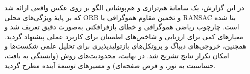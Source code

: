 
در این گزارش، یک سامانهٔ هم‌ترازی و هم‌پوشانی الگو بر روی عکس واقعی ارائه شد که بر پایهٔ ویژگی‌های محلی ORB و تخمین مقاوم هموگرافی با RANSAC بنا شده است. چارچوب ریاضی هموگرافی و خطای بازفرافکنی به‌صورت دقیق تعریف شد و معیارهای کمی برای ارزیابی و شاخص‌های اطمینان برای کاربرد عملی پیشنهاد گردید. همچنین، خروجی‌های دیباگ و پروتکل‌های بازتولیدپذیری برای تحلیل علمی شکست‌ها و امکان تکرار نتایج تشریح شد. در نهایت، محدودیت‌های روش (وابستگی به بافت، حساسیت به نور، و فرض صفحه‌ای) و مسیرهای توسعهٔ آینده مطرح گردید.
